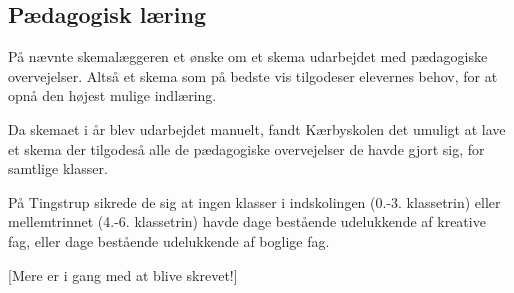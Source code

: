 \subsection{Pædagogisk læring}
\label{paedagogisk_laering}
På \school nævnte skemalæggeren et ønske om et skema udarbejdet med pædagogiske overvejelser. Altså et skema som på bedste vis tilgodeser elevernes behov, for at opnå den højest mulige indlæring.

Da skemaet i år blev udarbejdet manuelt, fandt Kærbyskolen det umuligt at lave et skema der tilgodeså alle de pædagogiske overvejelser de havde gjort sig, for samtlige klasser\cite{interview_Kaerby}.

På Tingstrup sikrede de sig at ingen klasser i indskolingen (0.-3. klassetrin) eller mellemtrinnet (4.-6. klassetrin) havde dage bestående udelukkende af kreative fag, eller dage bestående udelukkende af boglige fag. 

[Mere er i gang med at blive skrevet!]